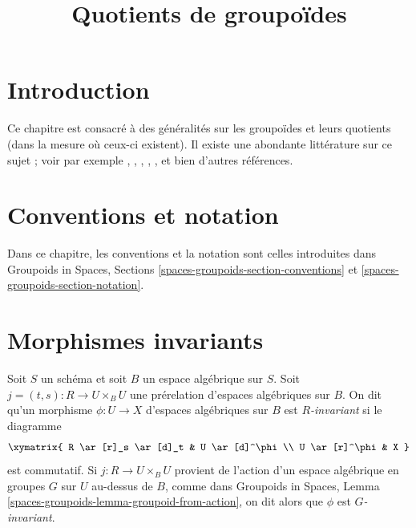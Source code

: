 

%


\title{Quotients de groupoïdes}


\maketitle

\label{section-phantom}

\tableofcontents

\section{Introduction}
\label{section-introduction}

\noindent
Ce chapitre est consacré à des généralités sur les groupoïdes et leurs
quotients (dans la mesure où ceux-ci existent).
Il existe une abondante littérature sur ce sujet ; voir par exemple
\cite{GIT}, \cite{seshadri_quotients}, \cite{KollarQuotients},
\cite{K-M}, \cite{KollarFinite}, et bien d'autres références.






\section{Conventions et notation}
\label{section-conventions-notation}

\noindent
Dans ce chapitre, les conventions et la notation sont celles introduites dans
Groupoids in Spaces, Sections \ref{spaces-groupoids-section-conventions}
et \ref{spaces-groupoids-section-notation}.


\section{Morphismes invariants}
\label{section-invariant}

\begin{definition}
\label{definition-invariant}
Soit $S$ un schéma et soit $B$ un espace algébrique sur $S$.
Soit $j = (t, s) : R \to U \times_B U$ une prérelation d'espaces
algébriques sur $B$. On dit qu'un morphisme $\phi : U \to X$ d'espaces algébriques
sur $B$ est {\it $R$-invariant} si le diagramme
$$
\xymatrix{
R \ar[r]_s \ar[d]_t & U \ar[d]^\phi \\
U \ar[r]^\phi & X
}
$$
est commutatif. Si $j : R \to U \times_B U$ provient de l'action
d'un espace algébrique en groupes $G$ sur $U$ au-dessus de $B$, comme dans
Groupoids in Spaces, Lemma \ref{spaces-groupoids-lemma-groupoid-from-action},
on dit alors que $\phi$ est {\it $G$-invariant}.
\end{definition}

